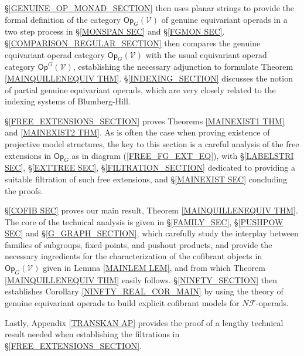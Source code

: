 \documentclass[a4paper,10pt]{article}%
\begin{document}
\S \ref{GENUINE_OP_MONAD_SECTION} then uses planar strings to provide the formal definition of the category 
$\mathsf{Op}_G(\mathcal{V})$
of genuine equivariant operads in a 
two step process in 
\S \ref{MONSPAN SEC} and \S \ref{FGMON SEC}.
\S \ref{COMPARISON_REGULAR_SECTION} then compares 
the genuine equivariant operad category
$\mathsf{Op}_G(\mathcal{V})$
with the usual equivariant operad category
$\mathsf{Op}^G(\mathcal{V})$,
establishing the necessary adjunction to formulate
Theorem \ref{MAINQUILLENEQUIV THM}.
\S \ref{INDEXING_SECTION}
discusses the notion of partial genuine equivariant operads, which are very closely related to the indexing systems of Blumberg-Hill.


\S \ref{FREE_EXTENSIONS_SECTION} 
proves 
Theorems \ref{MAINEXIST1 THM} and \ref{MAINEXIST2 THM}.
As is often the case when proving existence of projective model structures,
the key to this section is a careful analysis of  the free extensions in $\mathsf{Op}_G$ as in diagram
(\ref{FREE_FG_EXT_EQ}),
with 
\S \ref{LABELSTRI SEC}, 
\S \ref{EXTTREE SEC},
\S \ref{FILTRATION_SECTION}
dedicated to providing a suitable filtration of such free extensions,
and \S \ref{MAINEXIST SEC} concluding the proofs.

\S \ref{COFIB SEC} proves our main result,
Theorem \ref{MAINQUILLENEQUIV THM}.
The core of the technical analysis 
is given in 
\S \ref{FAMILY_SEC},
\S \ref{PUSHPOW SEC}
and \S \ref{G_GRAPH_SECTION}, 
which carefully study the interplay between families of subgroups, fixed points, and pushout products,
and provide the necessary ingredients for
the characterization of the cofibrant objects
in $\mathsf{Op}_G (\mathcal{V})$
given in Lemma \ref{MAINLEM LEM},
and from which 
Theorem \ref{MAINQUILLENEQUIV THM}
easily follows.
\S \ref{NINFTY_SECTION}
then establishes Corollary 
\ref{NINFTY_REAL_COR_MAIN}
by using the theory of genuine equivariant operads
to build explicit cofibrant models for 
$N \mathcal{F}$-operads.

Lastly,
Appendix \ref{TRANSKAN AP}
provides the proof of a lengthy technical result needed when establishing the filtrations in \S \ref{FREE_EXTENSIONS_SECTION}.
\end{document}
